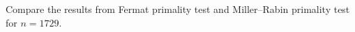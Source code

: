   Compare the results from Fermat primality test and Miller--Rabin
  primality test for $n = 1729$.
